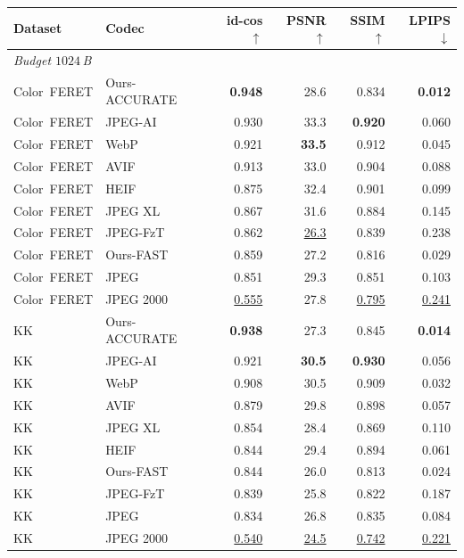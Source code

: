 \begin{tabular}{llrrrr}
\toprule
Dataset & Codec & id-cos$\uparrow$ & PSNR$\uparrow$ & SSIM$\uparrow$ & LPIPS$\downarrow$ \\
\midrule
\multicolumn{6}{l}{\emph{Budget $1024$\,B}}\\
Color~FERET & Ours-ACCURATE & \cellcolor{green!25}\textbf{0.948} & 28.6 & 0.834 & \cellcolor{green!25}\textbf{0.012} \\
Color~FERET & JPEG-AI & 0.930 & 33.3 & \cellcolor{green!25}\textbf{0.920} & 0.060 \\
Color~FERET & WebP & 0.921 & \cellcolor{green!25}\textbf{33.5} & 0.912 & 0.045 \\
Color~FERET & AVIF & 0.913 & 33.0 & 0.904 & 0.088 \\
Color~FERET & HEIF & 0.875 & 32.4 & 0.901 & 0.099 \\
Color~FERET & JPEG XL & 0.867 & 31.6 & 0.884 & 0.145 \\
Color~FERET & JPEG-FzT & 0.862 & \cellcolor{red!22}\underline{26.3} & 0.839 & 0.238 \\
Color~FERET & Ours-FAST & 0.859 & 27.2 & 0.816 & 0.029 \\
Color~FERET & JPEG & 0.851 & 29.3 & 0.851 & 0.103 \\
Color~FERET & JPEG 2000 & \cellcolor{red!22}\underline{0.555} & 27.8 & \cellcolor{red!22}\underline{0.795} & \cellcolor{red!22}\underline{0.241} \\
KK & Ours-ACCURATE & \cellcolor{green!25}\textbf{0.938} & 27.3 & 0.845 & \cellcolor{green!25}\textbf{0.014} \\
KK & JPEG-AI & 0.921 & \cellcolor{green!25}\textbf{30.5} & \cellcolor{green!25}\textbf{0.930} & 0.056 \\
KK & WebP & 0.908 & 30.5 & 0.909 & 0.032 \\
KK & AVIF & 0.879 & 29.8 & 0.898 & 0.057 \\
KK & JPEG XL & 0.854 & 28.4 & 0.869 & 0.110 \\
KK & HEIF & 0.844 & 29.4 & 0.894 & 0.061 \\
KK & Ours-FAST & 0.844 & 26.0 & 0.813 & 0.024 \\
KK & JPEG-FzT & 0.839 & 25.8 & 0.822 & 0.187 \\
KK & JPEG & 0.834 & 26.8 & 0.835 & 0.084 \\
KK & JPEG 2000 & \cellcolor{red!22}\underline{0.540} & \cellcolor{red!22}\underline{24.5} & \cellcolor{red!22}\underline{0.742} & \cellcolor{red!22}\underline{0.221} \\

\end{tabular}
